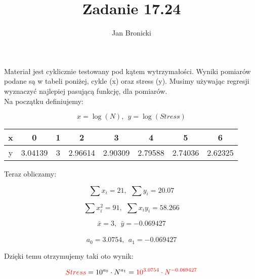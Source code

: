 \documentclass{article}
\title{Zadanie 17.24}
\author{Jan Bronicki}
\date{}
\begin{document}
\maketitle
Materiał jest cyklicznie testowany pod kątem wytrzymałości. Wyniki pomiarów podane są w tabeli poniżej, cykle (x) oraz stress (y). Musimy używając regresji wyznaczyć najlepiej pasującą funkcję, dla pomiarów.
\\
Na początku definiujemy:

$$
    x = \log(N), \ \ y = \log(Stress)
$$

\begin{center}
    \begin{tabular}{ c | c c c c c c c}
        x & 0       & 1 & 2       & 3       & 4       & 5       & 6       \\
        \hline
        y & 3.04139 & 3 & 2.96614 & 2.90309 & 2.79588 & 2.74036 & 2.62325
    \end{tabular}
\end{center}

Teraz obliczamy:

$$
    \sum x_{i} =21, \ \ \sum y_{i} = 20.07
$$

$$
    \sum x^{2}_{i} = 91, \ \ \sum x_{i}y_{i} = 58.266
$$

$$
    \bar{x} = 3, \ \ \bar{y} = -0.069427
$$
\\
$$
    a_{0} = 3.0754, \ \ a_{1} = -0.069427
$$


Dzięki temu otrzymujemy taki oto wynik:

$$
    \textcolor{red}{Stress} = 10^{a_{0}} \cdot N^{a_{1}} = \textcolor{red}{10^{3.0754} \cdot N^{-0.069427}}
$$
\end{document}
